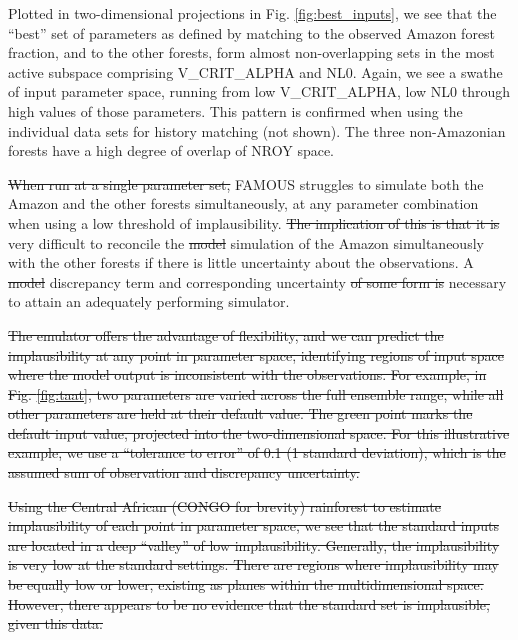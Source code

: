 \documentclass[esd, manuscript]{copernicus}
\providecommand{\DIFadd}[1]{{\protect\color{blue}\uwave{#1}}} %
\providecommand{\DIFdel}[1]{{\protect\color{red}\sout{#1}}}                      %
\providecommand{\DIFaddbegin}{} %
\providecommand{\DIFaddend}{} %
\providecommand{\DIFdelbegin}{} %
\providecommand{\DIFdelend}{} %
\begin{document}

Plotted in two-dimensional projections in Fig. \ref{fig:best_inputs}, we see that the ``best'' set of parameters as defined by matching to the observed Amazon forest fraction, and to the other forests, form almost non-overlapping sets in the most active subspace comprising V\_CRIT\_ALPHA and NL0. Again, we see a swathe of input parameter space, running from low V\_CRIT\_ALPHA, low NL0 through high values of those parameters. This pattern is confirmed when using the individual data sets for history matching (not shown). The three non-Amazonian forests have a high degree of overlap of NROY space.

\DIFdelbegin \DIFdel{When run at a single parameter set, }\DIFdelend FAMOUS struggles to simulate both the Amazon and the other forests simultaneously, at any parameter combination when using a low threshold of implausibility. \DIFdelbegin \DIFdel{The implication of this is that it is }\DIFdelend \DIFaddbegin \DIFadd{It is }\DIFaddend very difficult to reconcile the \DIFdelbegin \DIFdel{model }\DIFdelend simulation of the Amazon simultaneously with the other forests if there is little uncertainty about the observations. A \DIFdelbegin \DIFdel{model }\DIFdelend \DIFaddbegin \DIFadd{simulator }\DIFaddend discrepancy term and corresponding uncertainty \DIFdelbegin \DIFdel{of some form is }\DIFdelend \DIFaddbegin \DIFadd{is therefore }\DIFaddend necessary to attain an adequately performing simulator.


\DIFdelbegin \DIFdel{The emulator offers the advantage of flexibility, and we can predict the implausibility at any point in parameter space, identifying regions of input space where the model output is inconsistent with the observations. For example, in Fig.  \ref{fig:taat}, two parameters are varied across the full ensemble range, while all other parameters are held at their default value. The green point marks the default input value, projected into the two-dimensional space. For this illustrative example, we use a ``tolerance to error'' of 0.1 (1 standard deviation), which is the assumed sum of observation and discrepancy uncertainty.
}%

\DIFdel{Using the Central African (CONGO for brevity) rainforest to estimate implausibility of each point in parameter space, we see that the standard inputs are located in a deep ``valley'' of low implausibility. Generally, the implausibility is very low at the standard settings. There are regions where implausibility may be equally low or lower, existing as planes within the multidimensional space. However, there appears to be no evidence that the standard set is implausible, given this data.
}%
\end{document}

